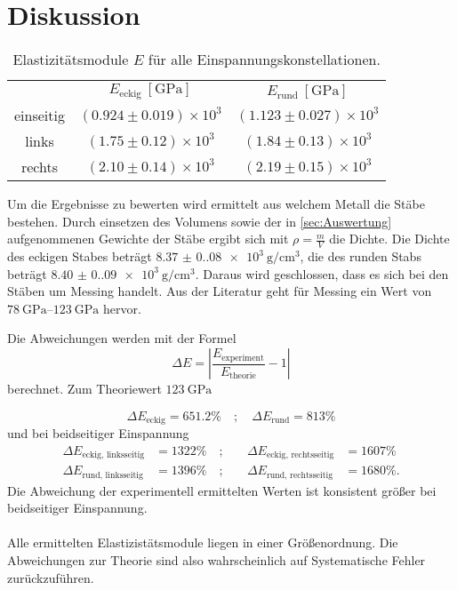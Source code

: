 \section{Diskussion}
\label{sec:Diskussion}

\begin{table}
    \centering
    \caption{Elastizitätsmodule $E$ für alle Einspannungskonstellationen.}
    \label{tab:Einspannungskonstellationen}
    \begin{tabular}{|c|c c|}
        \toprule
        & $E_{\text{eckig}}\:[\unit{\giga\pascal}]$ & $E_{\text{rund}}\:[\unit{\giga\pascal}]$\\
        \cmidrule(lr){2-3}
        einseitig & $(0.924 \pm 0.019)\times 10^3$ & $(1.123 \pm 0.027)\times 10^3$\\
        \midrule
        links & $(1.75 \pm 0.12)\times 10^3$ & $(1.84 \pm 0.13)\times 10^3$\\
        rechts & $(2.10 \pm 0.14)\times 10^3$ & $(2.19 \pm 0.15)\times 10^3$\\
        \bottomrule
    \end{tabular}
\end{table}

Um die Ergebnisse zu bewerten wird ermittelt aus welchem Metall die Stäbe bestehen. Durch einsetzen des Volumens sowie der in \autoref{sec:Auswertung}
aufgenommenen Gewichte der Stäbe ergibt sich mit $ρ = \frac{m}{V}$ die Dichte. Die Dichte des eckigen Stabes beträgt $\SI{8.37(0.08)e3}{\gram\per\centi\meter\cubed}$, die 
des runden Stabs beträgt $\SI{8.40(0.09)e3}{\gram\per\centi\meter\cubed}.$ Daraus wird geschlossen, dass es sich bei den Stäben um Messing handelt. 
Aus der Literatur\cite{chemie.de} geht für Messing ein Wert von $\SIrange{78}{123}{\giga\pascal}$ hervor.

Die Abweichungen werden mit der Formel
\begin{equation*}
    ΔE = \left\lvert \frac{E_{\text{experiment}}}{E_{\text{theorie}}} - 1 \right\rvert 
\end{equation*} berechnet.
Zum Theoriewert $\SI{123}{\giga\pascal}$

\begin{equation*}
    ΔE_{\text{eckig}} = 651.2\% \quad ; \quad ΔE_{\text{rund}} = 813\%
\end{equation*} 
und bei beidseitiger Einspannung
\begin{align*}
    ΔE_{\text{eckig, linksseitig}} &= 1322\% \quad ; &\quad ΔE_{\text{eckig, rechtsseitig}} &= 1607\% \\
    ΔE_{\text{rund, linksseitig}} &= 1396\% \quad ; &\quad ΔE_{\text{rund, rechtsseitig}} &= 1680\%.
\end{align*}
Die Abweichung der experimentell ermittelten Werten ist konsistent größer bei beidseitiger Einspannung.\\
\\
Alle ermittelten Elastizistätsmodule liegen in einer Größenordnung. Die Abweichungen zur Theorie sind also 
wahrscheinlich auf Systematische Fehler zurückzuführen.\\
\newpage